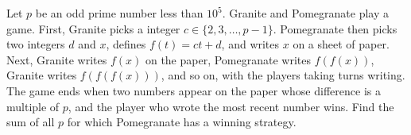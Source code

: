 Let $p$ be an odd prime number less than $10^5$. Granite and Pomegranate play a game. First, Granite picks a integer $c \in \{2,3,\dots,p-1\}$.
Pomegranate then picks two integers $d$ and $x$, defines $f(t) = ct + d$, and writes $x$ on a sheet of paper.
Next, Granite writes $f(x)$ on the paper, Pomegranate writes $f(f(x))$, Granite writes $f(f(f(x)))$, and so on, with the players taking turns writing.
The game ends when two numbers appear on the paper whose difference is a multiple of $p$, and the player who wrote the most recent number wins. Find the sum of all $p$ for which Pomegranate has a winning strategy.
